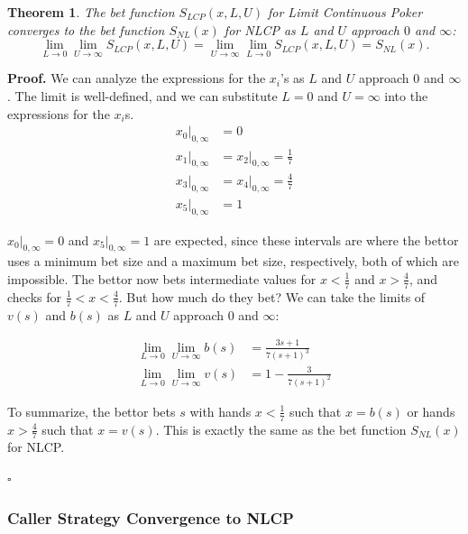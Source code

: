 \documentclass[a4paper,12pt]{article}
\theoremstyle{plain}
\newtheorem{theorem}{Theorem}[section]
\theoremstyle{definition}
\newenvironment{customproof}[1][Proof]{\noindent\textbf{#1.} }{\hfill$\square$\vspace{1em}}
\begin{document}
\begin{theorem}
    The bet function $S_{LCP}(x, L, U)$ for Limit Continuous Poker converges to the bet function $S_{NL}(x)$ for NLCP as $L$ and $U$ approach $0$ and $\infty$:
\[
\lim_{L \to 0} \lim_{U \to \infty} S_{LCP}(x, L, U) = \lim_{U \to \infty} \lim_{L \to 0} S_{LCP}(x, L, U) = S_{NL}(x).
\]
\end{theorem}
\begin{customproof}
We can analyze the expressions for the $x_i$'s as $L$ and $U$ approach $0$ and $\infty$. The limit is well-defined, and we can substitute $L=0$ and $U=\infty$ into the expressions for the $x_i$s.
\begin{align*}
    x_0|_{0,\infty} &= 0 \\
    x_1|_{0,\infty} &= x_2|_{0,\infty} = \frac{1}{7} \\
    x_3|_{0,\infty} &= x_4|_{0,\infty} = \frac{4}{7} \\
    x_5|_{0,\infty} &= 1
\end{align*}

$x_0|_{0,\infty} = 0$ and $x_5|_{0,\infty} = 1$ are expected, since these intervals are where the bettor uses a minimum bet size and a maximum bet size, respectively, both of which are impossible. The bettor now bets intermediate values for $x < \frac{1}{7}$ and $x > \frac{4}{7}$, and checks for $\frac{1}{7} < x < \frac{4}{7}$. But how much do they bet? We can take the limits of $v(s)$ and $b(s)$ as $L$ and $U$ approach $0$ and $\infty$:

\begin{align*}
    \lim_{L \to 0} \lim_{U \to \infty} b(s) &= \frac{3 s+1}{7 (s+1)^3}\\
    \lim_{L \to 0} \lim_{U \to \infty} v(s) &= 1 - \frac{3}{7 (s+1)^2}
\end{align*}

To summarize, the bettor bets $s$ with hands $x < \frac{1}{7}$ such that $x = b(s)$ or hands $x > \frac{4}{7}$ such that $x = v(s)$. This is exactly the same as the bet function $S_{NL}(x)$ for NLCP.

\end{customproof}

\subsubsection{Caller Strategy Convergence to NLCP}
\end{document}
